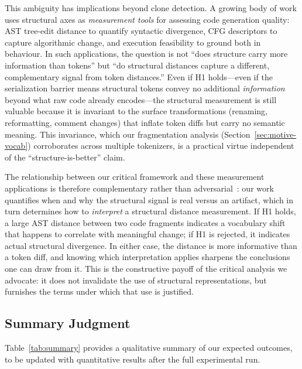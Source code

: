 \documentclass[pdflatex,sn-mathphys,Numbered]{sn-jnl}
\begin{document}
This ambiguity has implications beyond clone detection. A growing body of work uses structural axes as \emph{measurement tools} for assessing code generation quality: AST tree-edit distance to quantify syntactic divergence, CFG descriptors to capture algorithmic change, and execution feasibility to ground both in behaviour. In such applications, the question is not ``does structure carry more information than tokens'' but ``do structural distances capture a different, complementary signal from token distances.'' Even if H1 holds---even if the serialization barrier means structural tokens convey no additional \emph{information} beyond what raw code already encodes---the structural measurement is still valuable because it is invariant to the surface transformations (renaming, reformatting, comment changes) that inflate token diffs but carry no semantic meaning. This invariance, which our fragmentation analysis (Section~\ref{sec:motive-vocab}) corroborates across multiple tokenizers, is a practical virtue independent of the ``structure-is-better'' claim.

The relationship between our critical framework and these measurement applications is therefore complementary rather than adversarial~\citep{li2023understand}: our work quantifies when and why the structural signal is real versus an artifact, which in turn determines how to \emph{interpret} a structural distance measurement. If H1 holds, a large AST distance between two code fragments indicates a vocabulary shift that happens to correlate with meaningful change; if H1 is rejected, it indicates actual structural divergence. In either case, the distance is more informative than a token diff, and knowing which interpretation applies sharpens the conclusions one can draw from it. This is the constructive payoff of the critical analysis we advocate: it does not invalidate the use of structural representations, but furnishes the terms under which that use is justified.

\subsection{Summary Judgment}

Table~\ref{tab:summary} provides a qualitative summary of our expected outcomes, to be updated with quantitative results after the full experimental run.
\end{document}
